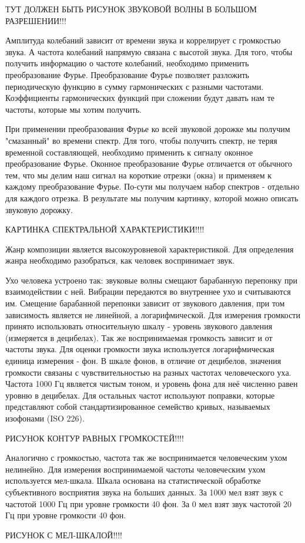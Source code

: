 ТУТ ДОЛЖЕН БЫТЬ РИСУНОК ЗВУКОВОЙ ВОЛНЫ В БОЛЬШОМ РАЗРЕШЕНИИ!!!

Амплитуда колебаний зависит от времени звука и коррелирует с громкостью звука. А частота колебаний напрямую связана с высотой звука. Для того, чтобы получить информацию о частоте колебаний, необходимо применить преобразование Фурье. Преобразование Фурье позволяет разложить периодическую функцию в сумму гармонических с разными частотами. Коэффициенты гармонических функций при сложении будут давать нам те частоты, которые мы хотим получить.

При применении преобразования Фурье ко всей звуковой дорожке мы получим "смазанный" во времени спектр. Для того, чтобы получить спектр, не теряя временной составляющей, необходимо применить к сигналу оконное преобразование Фурье. Оконное преобразование Фурье отличается от обычного тем, что мы делим наш сигнал на короткие отрезки (окна) и применяем к каждому преобразование Фурье. По-сути мы получаем набор спектров - отдельно для каждого отрезка. В результате мы получим картинку, которой можно описать звуковую дорожку.

КАРТИНКА СПЕКТРАЛЬНОЙ ХАРАКТЕРИСТИКИ!!!!

Жанр композиции является высокоуровневой характеристикой. Для определения жанра необходимо разобраться, как человек воспринимает звук.

Ухо человека устроено так: звуковые волны смещают барабанную перепонку при взаимодействии с ней. Вибрации передаются во внутреннее ухо и считываются им. Смещение барабанной перепонки зависит от звукового давления, при том зависимость является не линейной, а логарифмической. Для измерения громкости принято использовать относительную шкалу - уровень звукового давления (измеряется в децибелах). Так же воспринимаемая громкость зависит и от частоты звука. Для оценки громкости звука используется логарифмическая единица измерения - фон. В шкале фонов, в отличие от децибелов, значения громкости связаны с чувствительностью на разных частотах человеческого уха. Частота 1000 Гц является чистым тоном, и уровень фона для неё численно равен уровню в децибелах. Для остальных частот используют поправки, которые представляют собой стандартизированное семейство кривых, называемых изофонами (ISO 226).

РИСУНОК КОНТУР РАВНЫХ ГРОМКОСТЕЙ!!!!

Аналогично с громкостью, частота так же воспринимается человеческим ухом нелинейно. Для измерения воспринимаемой частоты человеческим ухом используется мел-шкала. Шкала основана на статистической обработке субъективного восприятия звука на больших данных. За 1000 мел взят звук с частотой 1000 Гц при уровне громкости 40 фон. За 0 мел взят звук частотой 20 Гц при уровне громкости 40 фон.

РИСУНОК С МЕЛ-ШКАЛОЙ!!!!
